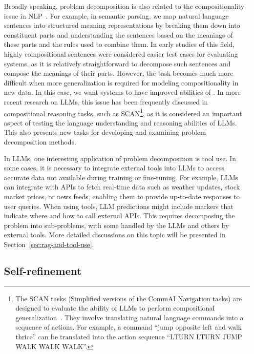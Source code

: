 Broadly speaking, problem decomposition is also related to the compositionality issue in NLP~\cite{drozdov-etal:2022compositional,press-etal:2023measuring}. For example, in semantic parsing, we map natural language sentences into structured meaning representations by breaking them down into constituent parts and understanding the sentences based on the meanings of these parts and the rules used to combine them. In early studies of this field, highly compositional sentences were considered easier test cases for evaluating systems, as it is relatively straightforward to decompose such sentences and compose the meanings of their parts. However, the task becomes much more difficult when more generalization is required for modeling compositionality in new data. In this case, we want systems to have improved abilities of . In more recent research on LLMs, this issue has been frequently discussed in compositional reasoning tasks, such as SCAN\footnote{The SCAN tasks (Simplified versions of the CommAI Navigation tasks) are designed to evaluate the ability of LLMs to perform compositional generalization~\cite{lake-etal:2018generalization}. They involve translating natural language commands into a sequence of actions. For example, a command ``jump opposite left and walk thrice'' can be translated into the action sequence ``LTURN LTURN JUMP WALK WALK WALK''.}, as it is considered an important aspect of testing the language understanding and reasoning abilities of LLMs. This also presents new tasks for developing and examining problem decomposition methods.

In LLMs, one interesting application of problem decomposition is tool use. In some cases, it is necessary to integrate external tools into LLMs to access accurate data not available during training or fine-tuning. For example, LLMs can integrate with APIs to fetch real-time data such as weather updates, stock market prices, or news feeds, enabling them to provide up-to-date responses to user queries. When using tools, LLM predictions might include markers that indicate where and how to call external APIs. This requires decomposing the problem into sub-problems, with some handled by the LLMs and others by external tools. More detailed discussions on this topic will be presented in Section~\ref{sec:rag-and-tool-use}.

\subsection{Self-refinement}
\label{sec:self-refinement}

